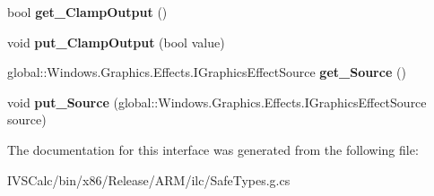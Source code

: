 \begin{DoxyCompactItemize}
bool {\bfseries get\+\_\+\+Clamp\+Output} ()
\item 
\mbox{\label{interface_microsoft_1_1_graphics_1_1_canvas_1_1_effects_1_1_i_gamma_transfer_effect_ab3ff726134045b1b77233ade0b6995d4}} 
void {\bfseries put\+\_\+\+Clamp\+Output} (bool value)
\item 
\mbox{\label{interface_microsoft_1_1_graphics_1_1_canvas_1_1_effects_1_1_i_gamma_transfer_effect_aea7e3d2cbe3be33670c9901dac6a435c}} 
global\+::\+Windows.\+Graphics.\+Effects.\+I\+Graphics\+Effect\+Source {\bfseries get\+\_\+\+Source} ()
\item 
\mbox{\label{interface_microsoft_1_1_graphics_1_1_canvas_1_1_effects_1_1_i_gamma_transfer_effect_a136e8d4fa2736c121266dd1c74cd1044}} 
void {\bfseries put\+\_\+\+Source} (global\+::\+Windows.\+Graphics.\+Effects.\+I\+Graphics\+Effect\+Source source)
\end{DoxyCompactItemize}


The documentation for this interface was generated from the following file\+:\begin{DoxyCompactItemize}
\item 
I\+V\+S\+Calc/bin/x86/\+Release/\+A\+R\+M/ilc/Safe\+Types.\+g.\+cs\end{DoxyCompactItemize}
